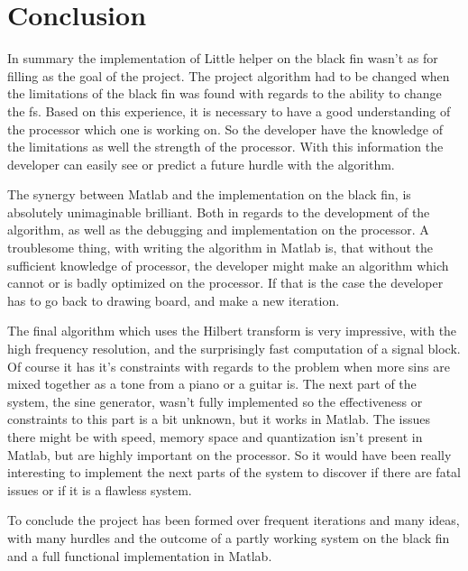 
\chapter{Conclusion}
In summary the implementation of Little helper on the black fin wasn't as for filling as the goal of the project.
The project algorithm had to be changed when the limitations of the black fin was found with regards to the ability to change the fs.
Based on this experience, it is necessary to have a good understanding of the processor which one is working on. 
So the developer have the knowledge of the limitations as well the strength of the processor. 
With this information the developer can easily see or predict a future hurdle with the algorithm.

The synergy between Matlab and the implementation on the black fin, is absolutely unimaginable brilliant.
Both in regards to the development of the algorithm, as well as the debugging and implementation on the processor. 
A troublesome thing, with writing the algorithm in Matlab is, that without the sufficient knowledge of processor, the developer might make an algorithm which cannot or is badly optimized on the processor.
If that is the case the developer has to go back to drawing board, and make a new iteration.

The final algorithm which uses the Hilbert transform is very impressive, with the high frequency resolution, and the surprisingly fast computation of a signal block.
Of course it has it's constraints with regards to the problem when more sins are mixed together as a tone from a piano or a guitar is.
The next part of the system, the sine generator, wasn't fully implemented so the effectiveness or constraints to this part is a bit unknown, but it works in Matlab.
The issues there might be with speed, memory space and quantization isn't present in Matlab, but are highly important on the processor.
So it would have been really interesting to implement the next parts of the system to discover if there are fatal issues or if it is a flawless system.

To conclude the project has been formed over frequent iterations and many ideas, with many hurdles and the outcome of a partly working system on the black fin and a full functional implementation in Matlab.
  
\FloatBarrier